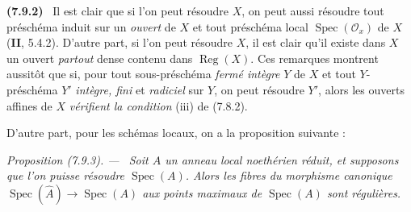 \documentclass[10pt,oneside]{book}
\newenvironment{env}[1][]{\par\medskip\noindent\textbf{(#1)}\ }{\par}
\newenvironment{proposition}[1][]{%
  \par\medskip\noindent\itshape Proposition (#1). ---\ }{\par}
\begin{document}
\begin{env}[7.9.2]
\label{IV.2.s7.9.2-fr}
Il est clair que si l'on peut résoudre $X$, on peut aussi résoudre tout
préschéma induit sur un \emph{ouvert} de $X$ et tout préschéma local
$\operatorname{Spec}(\mathcal O_x)$ de $X$ (\textbf{II}, 5.4.2). D'autre part,
si l'on peut résoudre $X$, il est clair qu'il existe dans $X$ un ouvert
\emph{partout} dense contenu dans $\operatorname{Reg}(X)$. Ces remarques
montrent aussitôt que si, pour tout sous-préschéma \emph{fermé intègre} $Y$ de
$X$ et tout $Y$-préschéma $Y'$ \emph{intègre, fini} et \emph{radiciel} sur
$Y$, on peut résoudre $Y'$, alors les ouverts affines de $X$ \emph{vérifient
la condition} (iii) de (7.8.2).

D'autre part, pour les schémas locaux, on a la proposition suivante :
\end{env}

\begin{proposition}[7.9.3]
\label{IV.2.s7.9.3-fr}
Soit $A$ un anneau local noethérien réduit, et supposons que l'on puisse
résoudre $\operatorname{Spec}(A)$. Alors les fibres du morphisme canonique
$\operatorname{Spec}(\widehat A)\to\operatorname{Spec}(A)$ aux points maximaux
de $\operatorname{Spec}(A)$ sont régulières.
\end{proposition}
\end{document}
